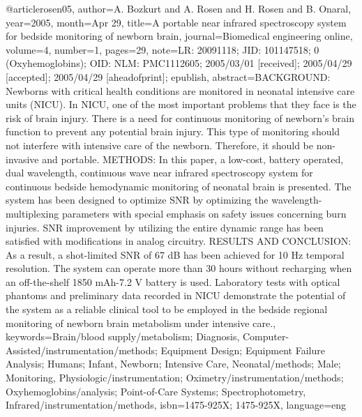 @article{rosen05,
	author={A. Bozkurt and A. Rosen and H. Rosen and B. Onaral},
	year={2005},
	month={Apr 29},
	title={A portable near infrared spectroscopy system for bedside monitoring of newborn brain},
	journal={Biomedical engineering online},
	volume={4},
	number={1},
	pages={29},
	note={LR: 20091118; JID: 101147518; 0 (Oxyhemoglobins); OID: NLM: PMC1112605; 2005/03/01 [received]; 2005/04/29 [accepted]; 2005/04/29 [aheadofprint]; epublish},
	abstract={BACKGROUND: Newborns with critical health conditions are monitored in neonatal intensive care units (NICU). In NICU, one of the most important problems that they face is the risk of brain injury. There is a need for continuous monitoring of newborn's brain function to prevent any potential brain injury. This type of monitoring should not interfere with intensive care of the newborn. Therefore, it should be non-invasive and portable. METHODS: In this paper, a low-cost, battery operated, dual wavelength, continuous wave near infrared spectroscopy system for continuous bedside hemodynamic monitoring of neonatal brain is presented. The system has been designed to optimize SNR by optimizing the wavelength-multiplexing parameters with special emphasis on safety issues concerning burn injuries. SNR improvement by utilizing the entire dynamic range has been satisfied with modifications in analog circuitry. RESULTS AND CONCLUSION: As a result, a shot-limited SNR of 67 dB has been achieved for 10 Hz temporal resolution. The system can operate more than 30 hours without recharging when an off-the-shelf 1850 mAh-7.2 V battery is used. Laboratory tests with optical phantoms and preliminary data recorded in NICU demonstrate the potential of the system as a reliable clinical tool to be employed in the bedside regional monitoring of newborn brain metabolism under intensive care.},
	keywords={Brain/blood supply/metabolism; Diagnosis, Computer-Assisted/instrumentation/methods; Equipment Design; Equipment Failure Analysis; Humans; Infant, Newborn; Intensive Care, Neonatal/methods; Male; Monitoring, Physiologic/instrumentation; Oximetry/instrumentation/methods; Oxyhemoglobins/analysis; Point-of-Care Systems; Spectrophotometry, Infrared/instrumentation/methods},
	isbn={1475-925X; 1475-925X},
	language={eng}
}

